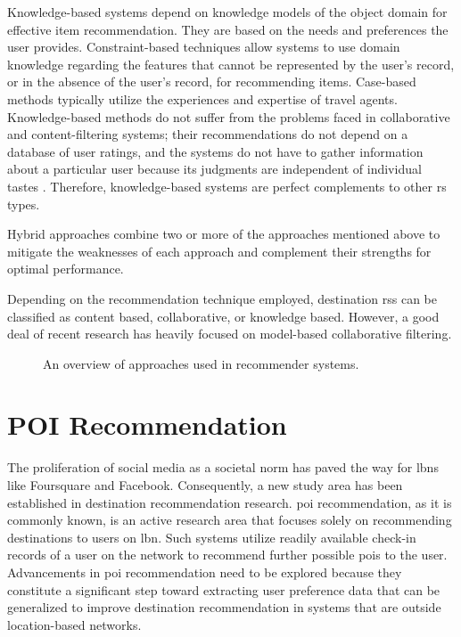 Knowledge-based systems \parencite{Burke2000Knowledge-basedSystems} depend on knowledge models of the object domain for effective item recommendation. They are based on the needs and preferences the user provides. Constraint-based techniques \parencite{Choi2021ATourismcity} allow systems to use domain knowledge regarding the features that cannot be represented by the user’s record, or in the absence of the user’s record, for recommending items. Case-based methods \parencite{Montejo-Raez2011Otium:Leisure} typically utilize the experiences and expertise of travel agents. Knowledge-based methods do not suffer from the problems faced in collaborative and content-filtering systems; their recommendations do not depend on a database of user ratings, and the systems do not have to gather information about a particular user because its judgments are independent of individual tastes \parencite{Burke2000Knowledge-basedSystems}. Therefore, knowledge-based systems are perfect complements to other \gls{rs} types.

Hybrid approaches \parencite{Adomavicius2005TowardExtensions,Ghazanfar2010BuildingFiltering} combine two or more of the approaches mentioned above to mitigate the weaknesses of each approach and complement their strengths for optimal performance.


Depending on the recommendation technique employed, destination \glspl{rs} can be classified as content based, collaborative, or knowledge based. However, a good deal of recent research has heavily focused on model-based collaborative filtering.

\begin{figure}[htpb]
  \centering
   
    \caption[Recommender Systems Approaches Overview]{An overview of approaches used in recommender systems.}\label{fig:recSystems-approaches}
\end{figure}

\section{POI Recommendation}
The proliferation of social media as a societal norm has paved the way for \Glspl{lbn} like Foursquare and Facebook. Consequently, a new study area has been established in destination recommendation research. \Gls{poi} recommendation, as it is commonly known, is an active research area that focuses solely on recommending destinations to users on \gls{lbn}. Such systems utilize readily available check-in records of a user on the network to recommend further possible \glspl{poi} to the user. Advancements in \gls{poi} recommendation need to be explored because they constitute a significant step toward extracting user preference data that can be generalized to improve destination recommendation in systems that are outside location-based networks.


